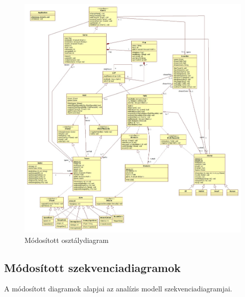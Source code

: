 \begin{figure}[H]
\begin{center}
\includegraphics[width=17cm]{chapters/chapter07/images/MainModSpec.jpg}
\caption{Módosított osztálydiagram}
\label{fig:Modositott_Osztálydiagram}
\end{center}
\end{figure}

\subsection{Módosított szekvenciadiagramok}
A módosított diagramok alapjai az analízis modell szekvenciadiagramjai.

